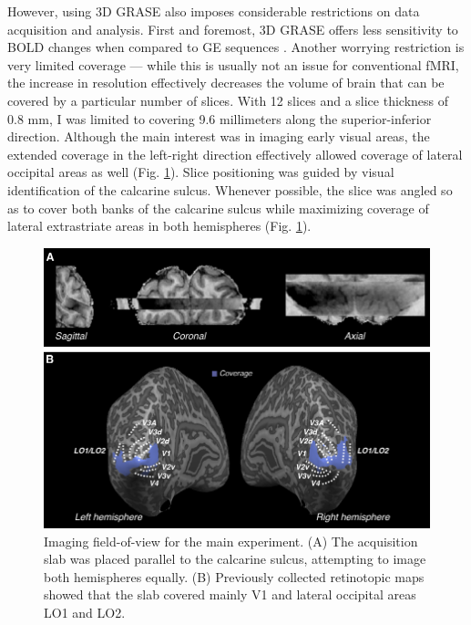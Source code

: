 However, using 3D GRASE also imposes considerable restrictions on data acquisition and analysis. First and foremost, 3D GRASE offers less sensitivity to BOLD changes when compared to GE sequences \cite{DeMartino:2013qy}. Another worrying restriction is very limited coverage --- while this is usually not an issue for conventional fMRI, the increase in resolution effectively decreases the volume of brain that can be covered by a particular number of slices. With 12 slices and a slice thickness of 0.8 mm, I was limited to covering 9.6 millimeters along the superior-inferior direction. Although the main interest was in imaging early visual areas, the extended coverage in the left-right direction effectively allowed coverage of lateral occipital areas as well (Fig. \ref{fig:ch5fig2}). Slice positioning was guided by visual identification of the calcarine sulcus. Whenever possible, the slice was angled so as to cover both banks of the calcarine sulcus while maximizing coverage of lateral extrastriate areas in both hemispheres (Fig. \ref{fig:ch5fig2}).

\begin{figure}
  \centering
  \includegraphics[keepaspectratio]{Fig2.pdf}
  \caption[Imaging field-of-view for the main experiment.]{Imaging field-of-view for the main experiment. (A) The acquisition slab was placed parallel to the calcarine sulcus, attempting to image both hemispheres equally. (B) Previously collected retinotopic maps showed that the slab covered mainly V1 and lateral occipital areas LO1 and LO2.}
  \label{fig:ch5fig2}
\end{figure}

